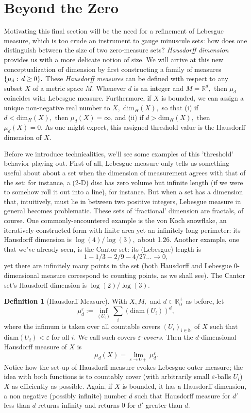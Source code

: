 \documentclass[12pt, letterpaper, oneside]{book}
\renewcommand{\ge}{\ensuremath{\varepsilon}}
\newcommand{\R}{\mathbb{R}}
\newcommand{\N}{\mathbb{N}}
\DeclarePairedDelimiter{\set}{\lbrace}{\rbrace}
\theoremstyle{plain}
\theoremstyle{definition}
\newtheorem{definition}{Definition}
\theoremstyle{remark}
\begin{document}
\section{Beyond the Zero}
Motivating this final section will be the need for a refinement of Lebesgue measure, which is too crude an instrument to gauge minuscule sets: how does one distinguish between the size of two zero-measure sets? \textit{Hausdorff dimension} provides us with a more delicate notion of size. We will arrive at this new conceptualization of dimension by first constructing a family of measures $\set{\mu_d:\,d \geq 0}.$ These \textit{Hausdorff measures} can be defined with respect to any subset $X$ of a metric space $M.$ Whenever $d$ is an integer and $M = \R^d,$ then $\mu_d$ coincides with Lebesgue measure. Furthermore, if $X$ is bounded, we can assign a unique non-negative real number to $X,$ $\mbox{dim}_H(X),$ so that (i) if $d < \mbox{dim}_H(X),$ then $\mu_d(X) = \infty$, and (ii) if $d > \mbox{dim}_H(X),$ then $\mu_d(X) = 0.$ As one might expect, this assigned threshold value is the Hausdorff dimension of $X.$ 

Before we introduce technicalities, we'll see some examples of this 'threshold' behavior playing out. First of all, Lebesgue measure only tells us something useful about about a set when the dimension of measurement agrees with that of the set: for instance, a (2-D) disc has zero volume but infinite length (if we were to somehow roll it out into a line), for instance. But when a set has a dimension that, intuitively, must lie in between two positive integers, Lebesgue measure in general becomes problematic. These sets of `fractional' dimension are fractals, of course. One commonly-encountered example is the von Koch snowflake, an iteratively-constructed form with finite area yet an infinitely long perimeter: its Hausdorff dimension is $\log(4)/\log(3),$ about 1.26. Another example, one that we've already seen, is the Cantor set: its (Lebesgue) length is 
\[
1 - 1/3 - 2/9 - 4/27 \ldots \to 0,
\]
yet there are infinitely many points in the set (both Hausdorff and Lebesgue 0-dimensional measure correspond to counting points, as we shall see). The Cantor set's Hausdorff dimension is $\log(2)/\log(3).$


\begin{definition}[Hausdorff Measure]
With $X,M,$ and $d \in \R_0^+$ as before, let
\[
\mu_d^{\ge} := \inf \limits_{(U_i)} \sum_i (\mbox{diam}(U_i))^d,
\]
where the infimum is taken over all countable covers $(U_i)_{i \in \N}$ of $X$ such that $\mbox{diam}(U_i) < \ge$ for all $i.$ We call such covers \textit{$\ge$-covers.} Then the  $d$-dimensional Hausdorff measure of $X$ is
\[
\mu_d(X) = \lim \limits_{\ge \to 0+} \mu_d^{\ge}.
\]
Notice how the set-up of Hausdorff measure evokes Lebesgue outer measure; the idea with both functions is to countably cover (with arbitrarily small $\ge$-balls $U_i$) $X$ as efficiently as possible. Again, if $X$ is bounded, it has a Hausdorff dimension, a non negative (possibly infinite) number $d$ such that Hausdorff measure for $d'$ less than $d$ returns infinity and returns 0 for $d'$ greater than $d.$ 
\end{definition}
\end{document}
